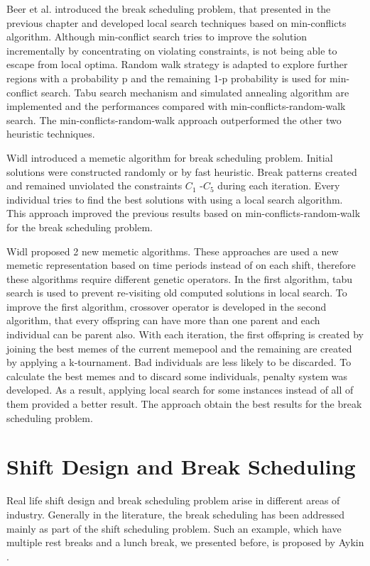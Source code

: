 Beer et al. \cite{li:2008:beer} introduced the break scheduling problem, that presented in the previous chapter and developed local search techniques based on min-conflicts algorithm. Although min-conflict search tries to improve the solution incrementally by concentrating on violating constraints, is not being able to escape from local optima. Random walk strategy is adapted to explore further regions with a probability p and the remaining 1-p probability is used for min-conflict search. Tabu search mechanism and simulated annealing algorithm \cite{li:2010:beer} are implemented and the performances compared with min-conflicts-random-walk search. The min-conflicts-random-walk approach outperformed the other two heuristic techniques.

Widl  \cite{li:2009:widl} introduced a memetic algorithm for break scheduling problem. Initial solutions were constructed randomly or by fast heuristic. Break patterns created and remained unviolated the constraints $C_1$ -$ C_5$   during each iteration. Every individual tries to find the best solutions with using a local search algorithm. This approach improved the previous results based on min-conflicts-random-walk for the break scheduling problem. 

Widl  \cite{li:2014:widl} \cite{li:2010:widl} \cite{li:2010:widlimp} proposed 2 new memetic algorithms. These approaches are used a new memetic representation based on time periods instead of on each shift, therefore these algorithms require different genetic operators. In the first algorithm, tabu search is used to prevent re-visiting old computed solutions in local search. To improve the first algorithm, crossover operator is developed in the second algorithm, that every offspring can have more than one parent and each individual can be parent also. With each iteration, the first offspring is created by joining the best memes of the current memepool and the remaining are created by applying a k-tournament. Bad individuals are less likely to be discarded. To calculate the best memes and to discard some individuals, penalty system was developed. As a result, applying local search for some instances instead of all of them provided a better result. The approach obtain the best results for the break scheduling problem.

\section{Shift Design and Break Scheduling}

Real life shift design and break scheduling problem arise in different areas of industry. Generally in the literature, the break scheduling has been addressed mainly as part of the shift scheduling problem. Such an example, which have multiple rest breaks and a lunch break, we presented before, is proposed by Aykin \cite{li:1996:aykin}. 

